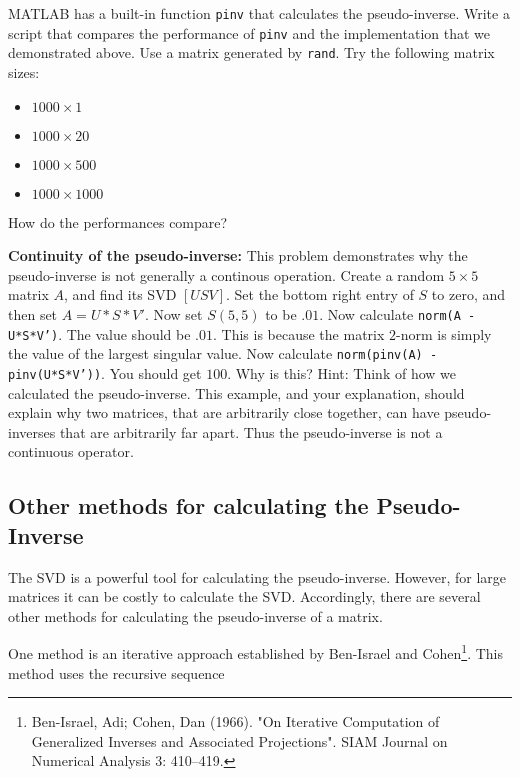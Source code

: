 \begin{problem}
MATLAB has a built-in function {\tt pinv} that calculates the pseudo-inverse. Write a script that compares the performance of {\tt pinv} and the implementation that we demonstrated above. Use a matrix generated by {\tt rand}. Try the following matrix sizes:
\begin{itemize}
\item $1000 \times 1$
\item $1000 \times 20$
\item $1000 \times 500$
\item $1000 \times 1000$
\end{itemize}
How do the performances compare?
\end{problem}

\begin{problem}
{\bf Continuity of the pseudo-inverse:} This problem demonstrates why the pseudo-inverse is not generally a continous operation. Create a random $5 \times 5$ matrix $A$, and find its SVD $[U S V]$. Set the bottom right entry of $S$ to zero, and then set $A = U*S*V'$. Now set $S(5,5)$ to be $.01$. Now calculate {\tt norm(A - U*S*V')}. The value should be $.01$. This is because the matrix $2$-norm is simply the value of the largest singular value. Now calculate {\tt norm(pinv(A) - pinv(U*S*V'))}. You should get $100$. Why is this? Hint: Think of how we calculated the pseudo-inverse. This example, and your explanation, should explain why two matrices, that are arbitrarily close together, can have pseudo-inverses that are arbitrarily far apart. Thus the pseudo-inverse is not a continuous operator.
\end{problem}

\subsection*{Other methods for calculating the Pseudo-Inverse}

The SVD is a powerful tool for calculating the pseudo-inverse. However, for large matrices it can be costly to calculate the SVD. Accordingly, there are several other methods for calculating the pseudo-inverse of a matrix.

One method is an iterative approach established by Ben-Israel and Cohen\footnote{Ben-Israel, Adi; Cohen, Dan (1966). "On Iterative Computation of Generalized Inverses and Associated Projections". SIAM Journal on Numerical Analysis 3: 410–419.}. This method uses the recursive sequence

